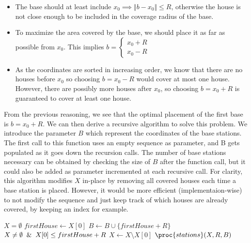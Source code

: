 \documentclass[a4paper, 10pt, twoside]{article}
\begin{document}
\begin{itemize}
	\item The base should at least include $x_0 \implies \Vert b - x_0 \Vert \leq R$, otherwise the house is not close enough to be included in the coverage radius of the base.
	\item To maximize the area covered by the base, we should place it as far as possible from $x_0$. This implies $b = \begin{cases} x_0 + R \\ x_0 - R \end{cases}$
	\item As the coordinates are sorted in increasing order, we know that there are no houses before $x_0$ so choosing $b = x_0 -R $ would cover at most one house. However, there are possibly more houses after $x_0$, so choosing $b = x_0 + R$ is guaranteed to cover at least one house.
\end{itemize}

From the previous reasoning, we see that the optimal placement of the first base is $b = x_0 + R$.  We can then derive a recursive algorithm to solve this problem. We introduce the parameter $B$ which represent the coordinates of the base stations. The first call to this function uses an empty sequence as parameter, and B gets populated as it goes down the recursion calls. The number of base stations necessary can be obtained by checking the size of $B$ after the function call, but it could also be added as parameter incremented at each recursive call. 
For clarity, this algorithm modifies $X$ in-place by removing all covered houses each time a base station is placed. However, it would be more efficient (implementaion-wise) to not modify the sequence and just keep track of which houses are already covered, by keeping an index for example.

\begin{codebox}
	\zi \If $X = \emptyset$
	\zi \Then \Return \End
	\zi $firstHouse \gets X[0]$
	\zi $B \gets B \cup \{ firstHouse + R \}$
	\zi \While $X \neq \emptyset \And X[0]  \leq firstHouse + R$
	\zi \Then $X \gets X \setminus X[0]$ \End
	\zi \Return $\proc{stations}(X, R, B)$ \End
\end{codebox}
\end{document}

